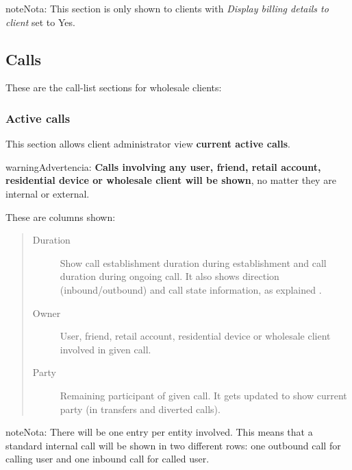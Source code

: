 \documentclass[letterpaper,10pt,spanish]{sphinxmanual}
\begin{document}
\begin{notice}{note}{Nota:}
This section is only shown to clients with \emph{Display billing details to client} set to Yes.
\end{notice}


\subsection{Calls}
\label{administration_portal/client/wholesale/calls/index::doc}\label{administration_portal/client/wholesale/calls/index:calls}
These are the call-list sections for wholesale clients:


\subsubsection{Active calls}
\label{administration_portal/client/wholesale/calls/active_calls::doc}\label{administration_portal/client/wholesale/calls/active_calls:active-calls}
This section allows client administrator view \textbf{current active calls}.

\begin{notice}{warning}{Advertencia:}
\textbf{Calls involving any user, friend, retail account, residential device or wholesale client will be shown},
no matter they are internal or external.
\end{notice}

These are columns shown:
\begin{quote}
\begin{description}
\item[{Duration}] \leavevmode
Show call establishment duration during establishment and call duration during ongoing call. It also shows
direction (inbound/outbound) and call state information, as explained {\hyperref[administration_portal/platform/active_calls:call\string-state]{}}.

\item[{Owner}] \leavevmode
User, friend, retail account, residential device or wholesale client involved in given call.

\item[{Party}] \leavevmode
Remaining participant of given call. It gets updated to show current party (in transfers and diverted calls).

\end{description}
\end{quote}

\begin{notice}{note}{Nota:}
There will be one entry per entity involved. This means that a standard internal call will be shown
in two different rows: one outbound call for calling user and one inbound call for called user.
\end{notice}
\end{document}

